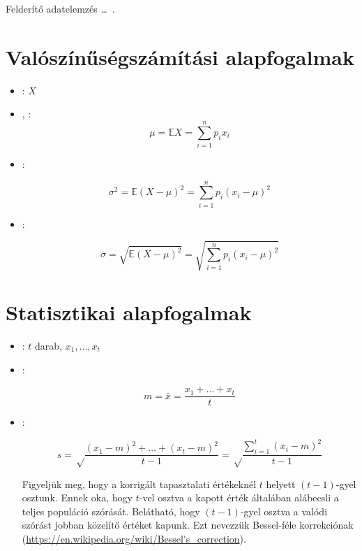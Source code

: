 
Felderítő adatelemzés \ldots~\cite{tukey77}.

\section{Valószínűségszámítási alapfogalmak}

\begin{definicio}
\begin{itemize}
\item {}: $X$
\item {}, :
$$\mu = \mathbb{E}X = \sum_{i=1}^{n} p_i x_i$$

\item {}:

$$\sigma^2 = \mathbb{E}\left(X-\mu\right)^2 = \sum_{i=1}^{n} p_i (x_i - \mu)^2$$

\item {}:

$$\sigma = \sqrt{\mathbb{E}\left(X-\mu\right)^2} = \sqrt{\sum_{i=1}^{n} p_i (x_i - \mu)^2}$$
\end{itemize}
\end{definicio}

\section{Statisztikai alapfogalmak}

\begin{definicio}
	\begin{itemize}
		\item {}: $t$ darab, $x_1, \dots, x_t$
		\item {}:

		$$m = \bar{x} = \frac{x_1 + \dots + x_t}{t}$$

		\item {}:

		$$s = \sqrt\frac{\left(x_1-m\right)^2 + \dots + \left(x_t-m\right)^2}{t-1} = \sqrt\frac{\sum_{i=1}^{t}\left(x_i - m\right)^2}{t-1}$$

		Figyeljük meg, hogy a korrigált tapasztalati értékeknél $t$ helyett $(t-1)$-gyel osztunk. Ennek oka, hogy $t$-vel osztva a kapott érték általában alábecsli a teljes populáció szórását. Belátható, hogy $(t-1)$-gyel osztva a valódi szórást jobban közelítő értéket kapunk. Ezt nevezzük Bessel-féle korrekciónak (\url{https://en.wikipedia.org/wiki/Bessel's\_correction}).
		\end{itemize}
	\end{definicio}

